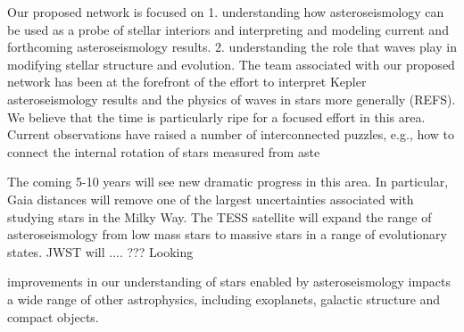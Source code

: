Our proposed network is focused on 1.  understanding how asteroseismology can be used as a probe of stellar interiors and interpreting and modeling current and forthcoming asteroseismology results.  2.  understanding the role that waves play in modifying stellar structure and evolution.  The team associated with our proposed network has been at the forefront of the effort to interpret Kepler asteroseismology results and the physics of waves in stars more generally (REFS).  We believe that the time is particularly ripe for a focused effort in this area.  Current observations have raised a number of interconnected puzzles, e.g., how to connect the internal rotation of stars measured from aste

The coming 5-10 years will see new dramatic progress in this area. In particular, Gaia distances will remove one of the largest uncertainties associated with studying stars in the Milky Way.  The TESS satellite will expand the range of asteroseismology from low mass stars to massive stars in a range of evolutionary states.   JWST will .... ???    Looking



improvements in our understanding of stars enabled by asteroseismology impacts a wide range of other astrophysics, including exoplanets, galactic structure and compact objects.   


